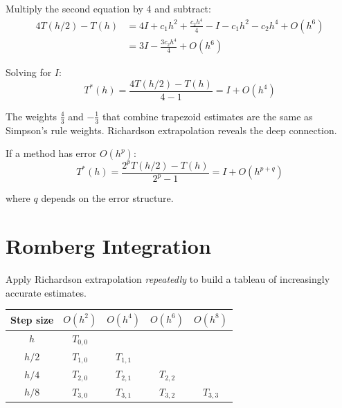  Multiply the second equation by 4 and subtract:
\begin{align}
    4T(h/2) - T(h) &= 4I + c_1 h^2 + \frac{c_2 h^4}{4} - I - c_1 h^2 - c_2 h^4 + O(h^6) \\
    &= 3I - \frac{3c_2 h^4}{4} + O(h^6)
\end{align}

Solving for $I$:
\begin{equation}
    \boxed{T^*(h) = \frac{4 T(h/2) - T(h)}{4 - 1} = I + O(h^4)}
\end{equation}


 The weights $\frac{4}{3}$ and $-\frac{1}{3}$ that combine trapezoid estimates are the same as Simpson's rule weights. Richardson extrapolation reveals the deep connection.

 If a method has error $O(h^p)$:
\begin{equation}
    T^*(h) = \frac{2^p T(h/2) - T(h)}{2^p - 1} = I + O(h^{p+q})
\end{equation}

where $q$ depends on the error structure.




\newpage
\section{Romberg Integration}

 Apply Richardson extrapolation \emph{repeatedly} to build a tableau of increasingly accurate estimates.


\begin{center}
\begin{tabular}{c|cccc}
Step size & $O(h^2)$ & $O(h^4)$ & $O(h^6)$ & $O(h^8)$ \\
\hline
$h$ & $T_{0,0}$ & & & \\
$h/2$ & $T_{1,0}$ & $T_{1,1}$ & & \\
$h/4$ & $T_{2,0}$ & $T_{2,1}$ & $T_{2,2}$ & \\
$h/8$ & $T_{3,0}$ & $T_{3,1}$ & $T_{3,2}$ & $T_{3,3}$ \\
\end{tabular}
\end{center}

